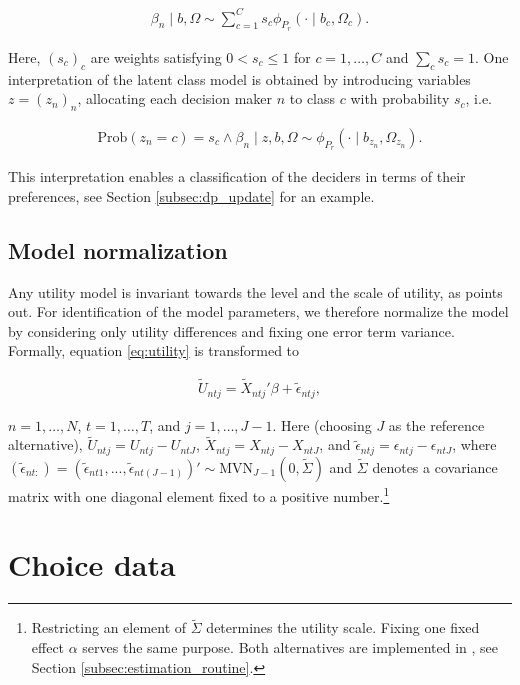 \documentclass[article]{jss}
\begin{document}
\begin{align*}
\beta_n\mid b,\Omega \sim \sum_{c=1}^{C} s_c \phi_{P_r} (\cdot \mid b_c,\Omega_c).
\end{align*}

Here, $(s_c)_{c}$ are weights satisfying $0 < s_c\leq 1$ for $c=1,\dots,C$ and $\sum_c s_c=1$. One interpretation of the latent class model is obtained by introducing variables $z=(z_n)_n$, allocating each decision maker $n$ to class $c$ with probability $s_c$, i.e.

\begin{align*}
\text{Prob}(z_n=c)=s_c \land \beta_n \mid z,b,\Omega \sim \phi_{P_r}(\cdot \mid b_{z_n},\Omega_{z_n}).
\end{align*}

This interpretation enables a classification of the deciders in terms of their preferences, see Section \ref{subsec:dp_update} for an example.

\subsection{Model normalization} \label{subsec:normalization}

Any utility model is invariant towards the level and the scale of utility, as \cite{Train:2009} points out. For identification of the model parameters, we therefore normalize the model by considering only utility differences and fixing one error term variance. Formally, equation \eqref{eq:utility} is transformed to

\begin{align*}
\tilde{U}_{ntj} = \tilde{X}_{ntj}' \beta + \tilde{\epsilon}_{ntj},
\end{align*}

$n=1,\dots,N$, $t=1,\dots,T$, and $j=1,\dots,J-1$. Here (choosing $J$ as the reference alternative), $\tilde{U}_{ntj} = U_{ntj} - U_{ntJ}$, $\tilde{X}_{ntj} = X_{ntj} - X_{ntJ}$, and $\tilde{\epsilon}_{ntj} = \epsilon_{ntj} - \epsilon_{ntJ}$, where $(\tilde{\epsilon}_{nt:}) = (\tilde{\epsilon}_{nt1},...,\tilde{\epsilon}_{nt(J-1)})' \sim \text{MVN}_{J-1} (0,\tilde{\Sigma})$ and $\tilde{\Sigma}$ denotes a covariance matrix with one diagonal element fixed to a positive number.\footnote{Restricting an element of $\tilde{\Sigma}$ determines the utility scale. Fixing one fixed effect $\alpha$ serves the same purpose. Both alternatives are implemented in , see Section \ref{subsec:estimation_routine}.}

\section{Choice data} \label{sec:choice_data}
\end{document}
